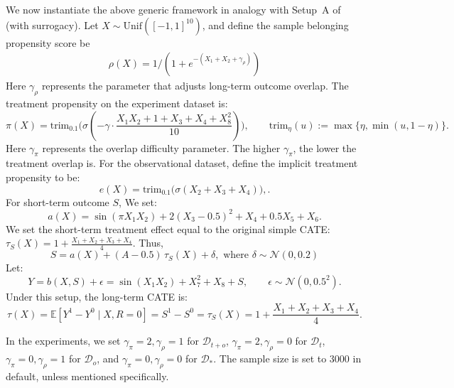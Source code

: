 \documentclass{article}
\theoremstyle{plain}
\theoremstyle{definition}
\theoremstyle{remark}
\newcommand{\E}{\mathbb{E}}                %
\newcommand{\1}{\mathds{1}}                %
\begin{document}
We now instantiate the above generic framework in analogy with Setup~A of \citet{Nie.2021} (with surrogacy). Let $X \sim \mathrm{Unif}([-1,1]^{10})$, and define the sample belonging propensity score be
\begin{align}
    \rho(X) = 1/(1+e^{-(X_1 + X_2 + \gamma_\rho)})
\end{align}
Here $\gamma_\rho$ represents the parameter that adjusts long-term outcome overlap. The treatment propensity on the experiment dataset is:
\begin{equation}
    \pi(X)
    = \mathrm{trim}_{0.1}\!\big(\sigma(-\gamma\cdot \frac{X_1 X_2 + 1 + X_3 + X_4 + X_8^2}{10})\big),
    \qquad
    \mathrm{trim}_{\eta}(u)
    := \max\{\eta,\min(u,1-\eta)\}.
\end{equation}
Here $\gamma_\pi$ represents the overlap difficulty parameter. The higher $\gamma_{\pi}$, the lower the treatment overlap is.
For the observational dataset, define the implicit treatment propensity to be:
\begin{equation}
    e(X)
    = \mathrm{trim}_{0.1}\!\big(\sigma(X_2 + X_3 + X_4)\big),.
\end{equation}
For short-term outcome $S$, We set:
\begin{equation}
    a(X)
    = \sin(\pi X_1 X_2)
      + 2(X_3 - 0.5)^2
      + X_4 + 0.5 X_5 + X_6.
\end{equation}
We set the short-term treatment effect equal to the original simple CATE: $\tau_S(X) = 1 +\frac{X_1 + X_2 + X_3 + X_4}{4}.$ Thus,
\begin{equation}
    S
    = a(X)
      + (A - 0.5)\,\tau_S(X)
      + \delta, \text{ where } \delta\sim \mathcal{N}(0,0.2)
\end{equation}
Let:
\begin{equation}
    Y = b(X,S) + \epsilon= \sin(X_1X_2)+ X_7^2 + X_8 + S,
    \qquad
    \epsilon \sim \mathcal{N}(0,0.5^2).
\end{equation}
Under this setup, the long-term CATE is:
\begin{equation}
\label{eq:setupA-cate}
    \tau(X)
    = \E[Y^1 - Y^0 \mid X, R=0]
    = S^1 - S^0
    = \tau_S(X)=1 +\frac{X_1 + X_2 + X_3 + X_4}{4}.
\end{equation}

In the experiments, we set $\gamma_\pi=2, \gamma_\rho=1$ for $\mathcal{D}_{t+o}$, $\gamma_\pi=2, \gamma_\rho=0$ for $\mathcal{D}_{t}$, $\gamma_\pi=0, \gamma_\rho=1$ for $\mathcal{D}_{o}$, and $\gamma_\pi=0, \gamma_\rho=0$ for $\mathcal{D}_{*}$. The sample size is set to 3000 in default, unless mentioned specifically. 
\end{document}
